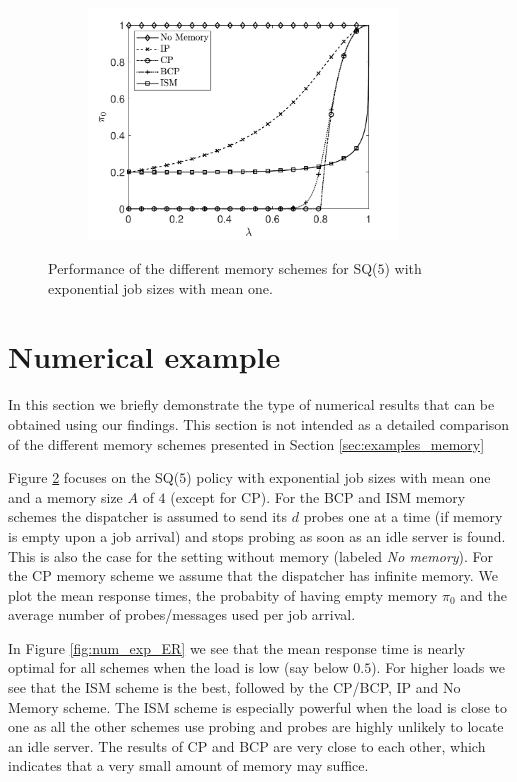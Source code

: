 \documentclass[12pt]{report}
\begin{document}
\begin{figure}[t]
\begin{subfigure}{.45\textwidth}
\includegraphics[width=0.9\textwidth]{figures/Chapter6/plot_pi0_ifo_lamA4.pdf}
\label{fig:num_exp_pi0}
\end{subfigure}

\caption{Performance of the different memory schemes for SQ($5$) with exponential job sizes with mean one.}
\label{fig:num_exp_SQd}
\end{figure}

\section{Numerical example} \label{sec:num_examples}

In this section we briefly demonstrate the type of numerical results that can be obtained using
our findings. This section is not intended as a detailed comparison of the different memory
schemes presented in Section \ref{sec:examples_memory} 

Figure \ref{fig:num_exp_SQd} focuses on the SQ($5$) policy with exponential job sizes with mean  one and a memory size $A$ of $4$ (except for CP). For the BCP and ISM memory schemes the dispatcher 
is assumed to send its $d$ probes one at a time (if memory is empty upon a job arrival) 
and stops probing as soon as an idle server is found. This is also the case for the setting
without memory (labeled {\it No memory}). For the CP memory scheme we assume that the dispatcher
has infinite memory. 
We plot the mean response times, the probabity of having empty memory $\pi_0$ and
the average number of probes/messages used per job arrival.

In Figure \ref{fig:num_exp_ER} we see that the mean response time is nearly optimal for all schemes
when the load is low (say below $0.5$). For higher loads we see that the ISM scheme is
the best, followed by the CP/BCP, IP and No Memory scheme. The ISM scheme is especially powerful
when the load is close to one as all the other schemes use probing and probes are highly unlikely
to locate an idle server. The results of CP and BCP are very close to each other, which indicates that
a very small amount of memory may suffice.  
\end{document}
